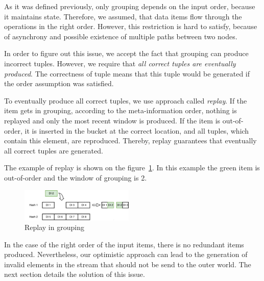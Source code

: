 \label {fs-collision}

As it was defined previously, only grouping depends on the input order, because it maintains state. Therefore, we assumed, that data items flow through the operations in the right order. However, this restriction is hard to satisfy, because of asynchrony and possible existence of multiple paths between two nodes.

In order to figure out this issue, we accept the fact that grouping can produce incorrect tuples. However, we require that {\it all correct tuples are eventually produced}. The correctness of tuple means that this tuple would be generated if the order assumption was satisfied. 

To eventually produce all correct tuples, we use approach called {\it replay}. If the item gets in grouping, according to the meta-information order, nothing is replayed and only the most recent window is produced. If the item is out-of-order, it is inserted in the bucket at the correct location, and all tuples, which contain this element, are reproduced. Thereby, replay guarantees that eventually all correct tuples are generated.

The example of replay is shown on the figure~\ref{grouping-replaying-figure}. In this example the green item is out-of-order and the window of grouping is 2.

\begin{figure}[htbp]
  \centering
  \includegraphics[width=0.48\textwidth]{pics/grouping-replaying}
  \caption{Replay in grouping}
  \label {grouping-replaying-figure}
\end{figure}

In the case of the right order of the input items, there is no redundant items produced. Nevertheless, our optimistic approach can lead to the generation of invalid elements in the stream that should not be send to the outer world. The next section details the solution of this issue.

